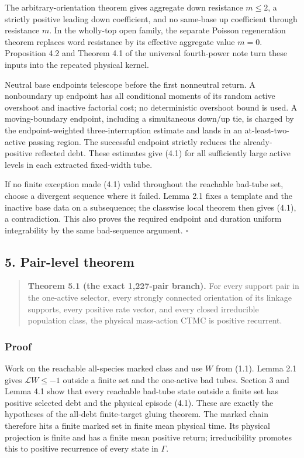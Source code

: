The arbitrary-orientation theorem gives aggregate down resistance
\(m\le2\), a strictly positive leading down coefficient, and no
same-base up coefficient through resistance \(m\). In the wholly-top
open family, the separate Poisson regeneration theorem replaces word
resistance by its effective aggregate value \(m=0\). Proposition 4.2 and
Theorem 4.1 of the universal fourth-power note turn these inputs into
the repeated physical kernel.

Neutral base endpoints telescope before the first nonneutral return. A
nonboundary up endpoint has all conditional moments of its random active
overshoot and inactive factorial cost; no deterministic overshoot bound
is used. A moving-boundary endpoint, including a simultaneous down/up
tie, is charged by the endpoint-weighted three-interruption estimate and
lands in an at-least-two-active passing region. The successful endpoint
strictly reduces the already-positive reflected debt. These estimates
give (4.1) for all sufficiently large active levels in each extracted
fixed-width tube.

If no finite exception made (4.1) valid throughout the reachable
bad-tube set, choose a divergent sequence where it failed. Lemma 2.1
fixes a template and the inactive base data on a subsequence; the
classwise local theorem then gives (4.1), a contradiction. This also
proves the required endpoint and duration uniform integrability by the
same bad-sequence argument. \(\square\)

\subsection{5. Pair-level theorem}

\begin{quote}
\textbf{Theorem 5.1 (the exact 1,227-pair branch).} For every support
pair in the one-active selector, every strongly connected orientation of
its linkage supports, every positive rate vector, and every closed
irreducible population class, the physical mass-action CTMC is positive
recurrent.
\end{quote}

\subsubsection{Proof}

Work on the reachable all-species marked class and use \(W\) from (1.1).
Lemma 2.1 gives \(\mathcal L W\le-1\) outside a finite set and the
one-active bad tubes. Section 3 and Lemma 4.1 show that every reachable
bad-tube state outside a finite set has positive selected debt and the
physical episode (4.1). These are exactly the hypotheses of the all-debt
finite-target gluing theorem. The marked chain therefore hits a finite
marked set in finite mean physical time. Its physical projection is
finite and has a finite mean positive return; irreducibility promotes
this to positive recurrence of every state in \(\Gamma\).

